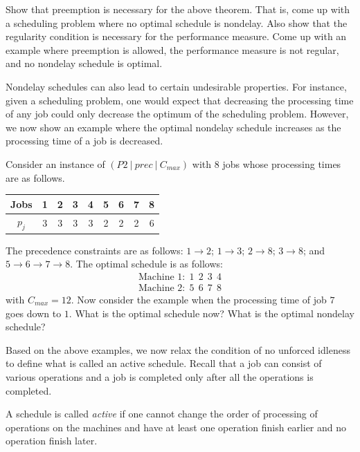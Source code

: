 \documentclass[11pt]{article}
\begin{document}
\begin{exercise}
Show that preemption is necessary for the above theorem. That is, come up with a scheduling problem where no optimal schedule is nondelay. Also show that the regularity condition is necessary for the performance measure. Come up with an example where preemption is allowed, the performance measure is not regular, and no nondelay schedule is optimal.
\end{exercise}

Nondelay schedules can also lead to certain undesirable properties. For instance, given a scheduling problem, one would expect that decreasing the processing time of any job could only decrease the optimum of the scheduling problem. However, we now show an example where the optimal nondelay schedule increases as the processing time of a job is decreased.

\begin{example}
Consider an instance of $(P2 ~|~ prec ~|~ C_{max})$ with $8$ jobs whose processing times are as follows.
\begin{center}
\begin{tabular}{|c||c|c|c|c|c|c|c|c|}\hline
Jobs & 1 & 2 & 3 & 4 & 5 & 6 & 7 & 8 \\ \hline
$p_j$ & 3 & 3 & 3 & 3 & 2 & 2 & 2 & 6\\
\hline
\end{tabular}
\end{center}
\vspace{0.1in}
The precedence constraints are as follows: $1\to 2$; $1\to 3$; $2\to 8$; $3\to 8$; and $5\to 6\to 7\to 8$. 
The optimal schedule is as follows: 
\begin{align*}
\mbox{Machine 1:} ~~ 1 ~~ 2 ~~ 3 ~~ 4 \\
\mbox{Machine 2:} ~~ 5 ~~ 6 ~~ 7 ~~ 8 
\end{align*}
with $C_{max} = 12$. Now consider the example when the processing time of job $7$ goes down to $1$. What is the optimal schedule now? What is the optimal nondelay schedule?
\end{example}

Based on the above examples, we now relax the condition of no unforced idleness to define what is called an active schedule. Recall that a job can consist of various operations and a job is completed only after all the operations is completed.

\begin{definition}
A schedule is called {\em active} if one cannot change the order of processing of operations on the machines and have at least one operation finish earlier and no operation finish later.
\end{definition}
\end{document}
